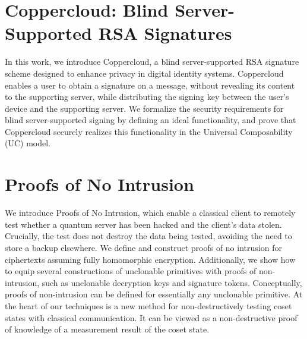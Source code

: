 \documentclass[11pt,oneside]{book}
\theoremstyle{definition}
\theoremstyle{remark}
\theoremstyle{plain}
\begin{document}
\section{\cite{cryptoeprint:2025/1824} Coppercloud: Blind Server-Supported RSA Signatures}
 In this work, we introduce Coppercloud, a blind server-supported RSA signature scheme designed to enhance privacy in digital identity systems. Coppercloud enables a user to obtain a signature on a message, without revealing its content to the supporting server, while distributing the signing key between the user's device and the supporting server. We formalize the security requirements for blind server-supported signing by defining an ideal functionality, and prove that Coppercloud securely realizes this functionality in the Universal Composability (UC) model.
 
 \section{\cite{cryptoeprint:2025/1826} Proofs of No Intrusion}
 We introduce Proofs of No Intrusion, which enable a classical client to remotely test whether a quantum server has been hacked and the client's data stolen. Crucially, the test does not destroy the data being tested, avoiding the need to store a backup elsewhere. We define and construct proofs of no intrusion for ciphertexts assuming fully homomorphic encryption. Additionally, we show how to equip several constructions of unclonable primitives with proofs of non-intrusion, such as unclonable decryption keys and signature tokens. Conceptually, proofs of non-intrusion can be defined for essentially any unclonable primitive. At the heart of our techniques is a new method for non-destructively testing coset states with classical communication. It can be viewed as a non-destructive proof of knowledge of a measurement result of the coset state.
 
 
\end{document}
